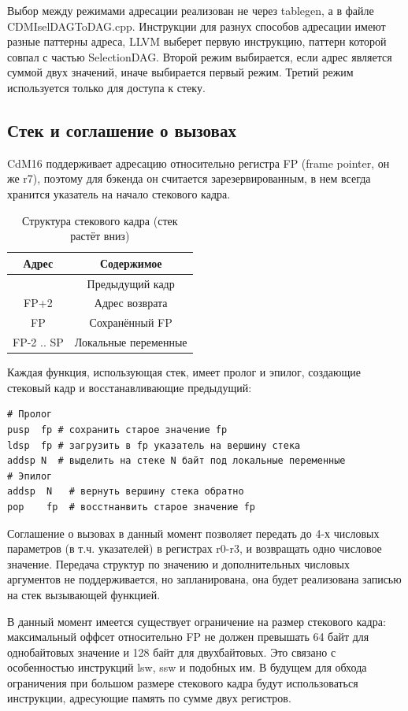 \documentclass[a4paper,14pt]{extarticle}
\begin{document}
Выбор между режимами адресации реализован не через tablegen, а в файле CDMIselDAGToDAG.cpp. Инструкции для разнух способов адресации имеют разные паттерны адреса, LLVM выберет первую инструкцию, паттерн которой совпал с частью SelectionDAG. Второй режим выбирается, если адрес является суммой двух значений, иначе выбирается первый режим. Третий режим используется только для доступа к стеку.

\subsection{Стек и соглашение о вызовах}
CdM16 поддерживает адресацию относительно регистра FP (frame pointer, он же r7), поэтому для бэкенда он считается зарезервированным, в нем всегда хранится указатель на начало стекового кадра.
\begin{table}[!h]
	\begin{center}
		\begin{tabular}{ |c|c| }
			\hline
			Адрес & Содержимое \\
			\hline
			 & Предыдущий кадр \\
			 FP+2 & Адрес возврата \\
			 FP & Сохранённый FP \\
			 FP-2 .. SP & Локальные переменные \\
			 \hline
		\end{tabular}
		\caption{Структура стекового кадра (стек растёт вниз)}
	\end{center}
\end{table}

Каждая функция, использующая стек, имеет пролог и эпилог, создающие стековый кадр и восстанавливающие предыдущий:
\begin{verbatim}
# Пролог
pusр  fp # сохранить старое значение fp
ldsp  fp # загрузить в fp указатель на вершину стека
addsp N  # выделить на стеке N байт под локальные переменные
# Эпилог
addsp  N   # вернуть вершину стека обратно
pop    fp  # восстнанвить старое значение fp
\end{verbatim}

Соглашение о вызовах в данный момент позволяет передать до 4-х числовых параметров (в т.ч. указателей) в регистрах r0-r3, и возвращать одно числовое значение. Передача структур по значению и дополнительных числовых аргументов не поддерживается, но запланирована, она будет реализована записью на стек вызывающей функцией.

В данный момент имеется существует ограничение на размер стекового кадра: максимальный оффсет относительно FP не должен превышать 64 байт для однобайтовых значение и 128 байт для двухбайтовых. Это связано с особенностью инструкций lsw, ssw и подобных им. В будущем для обхода ограничения при большом размере стекового кадра будут использоваться инструкции, адресующие память по сумме двух регистров.
\end{document}
